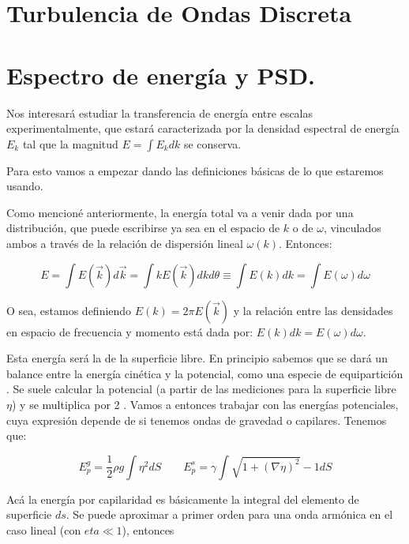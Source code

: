 \section{Turbulencia de Ondas Discreta}



\section{Espectro de energía y PSD.}
Nos interesará estudiar la transferencia de energía entre escalas experimentalmente, que estará caracterizada por la densidad espectral de energía $E_k$ tal que la magnitud $E = \int E_k dk$ se conserva. 

Para esto vamos a empezar dando las definiciones básicas de lo que estaremos usando.

Como mencioné anteriormente, la energía total va a venir dada por una distribución, que puede escribirse ya sea en el espacio de $k$ o de $\omega$, vinculados ambos a través de la relación de dispersión lineal $\omega(k)$. Entonces:

\begin{equation}
	E = \int E(\vec k) d\vec k = \int k E(\vec k) dkd\theta \equiv \int E(k) dk = \int E(\omega) d\omega
\end{equation}

O sea, estamos definiendo $E(k) = 2\pi E(\vec k)$ y la relación entre las densidades en espacio de frecuencia y momento está dada por: $E(k) dk = E(\omega) d\omega$.

Esta energía será la de la superficie libre. En principio sabemos que se dará un balance entre la energía cinética y la potencial, como una especie de equipartición \cite{kunduFluidMechanics2014}. Se suele calcular la potencial (a partir de las mediciones para la superficie libre $\eta$) y se multiplica por 2 \cite{deikeEtudesExperimentalesNumeriques2013}. Vamos a entonces trabajar con las energías potenciales, cuya expresión depende de si tenemos ondas de gravedad o capilares. Tenemos que:

\begin{equation}
	E_p^g = \frac{1}{2} \rho g \int \eta^2 dS \qquad E_p^s = \gamma \int\sqrt{1+(\nabla\eta)^2} - 1 dS
\end{equation}

Acá la energía por capilaridad es básicamente la integral del elemento de superficie $ds$. Se puede aproximar a primer orden para una onda armónica en el caso lineal (con $eta\ll1$), entonces \cite{deikeEtudesExperimentalesNumeriques2013}

